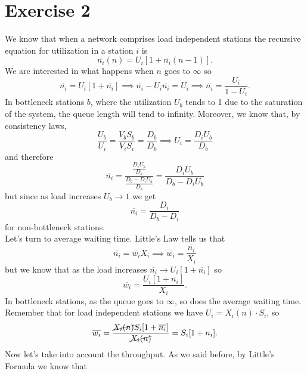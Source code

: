 \documentclass[12pt,a4paper]{article}
\begin{document}
	\section*{Exercise 2}
	We know that when a network comprises load independent stations the recursive equation for utilization in a station $i$ is
	\begin{equation*}
		\overline{n_{i}}(n)=U_{i}[1+\overline{n_{i}}(n-1)].
	\end{equation*}
	We are interested in what happens when $n$ goes to $\infty$ so
	\begin{equation*}
		\overline{n_{i}}=U_i[1+\overline{n_{i}}]\implies\overline{n_{i}}-U_i\overline{n_{i}}=U_i\implies \overline{n_{i}}=\frac{U_i}{1-U_i}.
	\end{equation*}
	In bottleneck stations $b$, where the utilization $U_b$ tends to 1 due to the saturation of the system, the queue length will tend to infinity.
	Moreover, we know that, by consistency laws,
	\begin{equation*}
		\frac{U_b}{U_i}=\frac{V_bS_b}{V_iS_i}=\frac{D_{b}}{D_b}\implies U_i=\frac{D_iU_b}{D_b}
	\end{equation*}
	and therefore
	\begin{equation*}
		\overline{n_{i}}=\frac{\frac{D_iU_b}{D_b}}{\frac{D_b-D_iU_b}{D_b}}=\frac{D_iU_b}{D_b-D_iU_b}
	\end{equation*}
	but since as load increases $U_b\to1$ we get
	\begin{equation*}
		\overline{n_{i}}=\frac{D_i}{D_b-D_i}
	\end{equation*}
	for non-bottleneck stations.\\
	Let's turn to average waiting time. Little's Law tells us that 
	\begin{equation*}
		\overline{n_{i}}=\overline{w_i}X_i\implies\overline{w_i}=\frac{\overline{n_i}}{X_i}
	\end{equation*}
	but we know that as the load increases $\overline{n_{i}}\to U_i[1+\overline{n_{i}}]$ so 
	\begin{equation*}
		\overline{w_i}=\frac{U_i[1+\overline{n_{i}}]}{X_i}.
	\end{equation*}
	In bottleneck stations, as the queue goes to $\infty$, so does the average waiting time. Remember that for load independent stations we have $U_i=X_i(n)\cdot S_i$, so
	\begin{equation*}
		\overline{w_i}=\frac{\cancel{X_i(n)}S_i[1+\overline{n_{i}}]}{\cancel{X_i(n)}}=S_i[1+n_i].
	\end{equation*}
	Now let's take into account the throughput. As we said before, by Little's Formula we know that 
\end{document}

